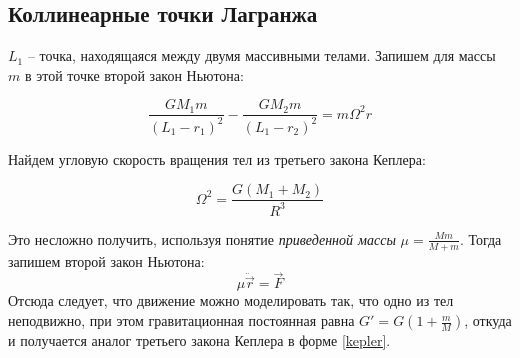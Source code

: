\documentclass[12pt]{article}
\begin{document}
    \subsection{Коллинеарные точки Лагранжа}
    \par $L_1$ -- точка, находящаяся между двумя массивными телами. Запишем для
    массы $m$ в этой точке второй закон Ньютона:

    \begin{equation}
        \frac{GM_1m}{(L_1 - r_1)^2} - \frac{GM_2m}{(L_1 - r_2)^2} = m\Omega^2r
        \label{L1}
    \end{equation}

    \par Найдем угловую скорость вращения тел из третьего закона Кеплера:

    \begin{equation}
        \Omega^2 = \frac{G(M_1 + M_2)}{R^3}
        \label{kepler}
    \end{equation}

    Это несложно получить, используя понятие \textit{приведенной массы}
    $\mu = \frac{Mm}{M + m} $. Тогда запишем второй закон Ньютона:
    $$ \mu \ddot{\vec{r}} = \vec{F} $$
    Отсюда следует, что движение можно моделировать так, что одно из тел
    неподвижно, при этом гравитационная постоянная равна $ G' = 
    G\left(1 + \frac{m}{M}\right) $, откуда и получается аналог третьего закона
    Кеплера в форме \ref{kepler}.

    \par 
\end{document}
